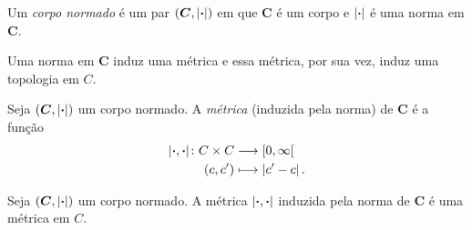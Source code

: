 \begin{definition}
Um \emph{corpo normado} é um par $(\bm C,\left\vert{\bm{\cdot}}\right\vert)$ em que $\bm C$ é um corpo e $\left\vert{\bm{\cdot}}\right\vert$ é uma norma em $\bm C$.
\end{definition}

Uma norma em $\bm C$ induz uma métrica e essa métrica, por sua vez, induz uma topologia em $C$.

\begin{definition}
Seja $(\bm C,\left\vert{\bm{\cdot}}\right\vert)$ um corpo normado. A \emph{métrica} (induzida pela norma) de $\bm C$ é a função
	\begin{align*}
	{\left\vert{\bm{\cdot}},{\bm{\cdot}}\right\vert}\colon {C \times C} &\longrightarrow {\left[{0},{\infty}\right[} \\{(c,c')} &\longmapsto \left\vert{c'-c}\right\vert.
	\end{align*}
\end{definition}

\begin{proposition}
Seja $(\bm C,\left\vert{\bm{\cdot}}\right\vert)$ um corpo normado. A métrica $\left\vert{\bm{\cdot}},{\bm{\cdot}}\right\vert$ induzida pela norma de $\bm C$ é uma métrica em $C$.
\end{proposition}


